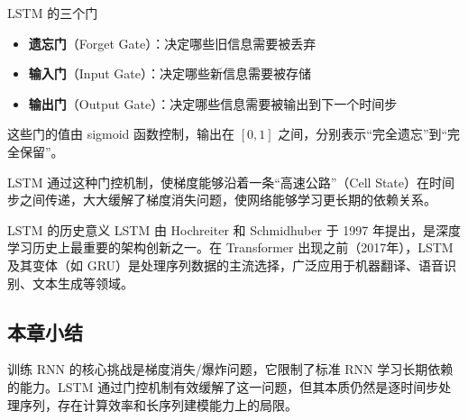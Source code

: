 \begin{importantbox}{LSTM 的三个门}
\begin{itemize}
    \item \textbf{遗忘门}（Forget Gate）：决定哪些旧信息需要被丢弃
    \item \textbf{输入门}（Input Gate）：决定哪些新信息需要被存储
    \item \textbf{输出门}（Output Gate）：决定哪些信息需要被输出到下一个时间步
\end{itemize}
这些门的值由 sigmoid 函数控制，输出在 $[0, 1]$ 之间，分别表示``完全遗忘''到``完全保留''。
\end{importantbox}

LSTM 通过这种门控机制，使梯度能够沿着一条``高速公路''（Cell State）在时间步之间传递，大大缓解了梯度消失问题，使网络能够学习更长期的依赖关系。

\begin{knowledgebox}{LSTM 的历史意义}
LSTM 由 Hochreiter 和 Schmidhuber 于 1997 年提出，是深度学习历史上最重要的架构创新之一。在 Transformer 出现之前（2017年），LSTM 及其变体（如 GRU）是处理序列数据的主流选择，广泛应用于机器翻译、语音识别、文本生成等领域。
\end{knowledgebox}

\subsection{本章小结}

训练 RNN 的核心挑战是梯度消失/爆炸问题，它限制了标准 RNN 学习长期依赖的能力。LSTM 通过门控机制有效缓解了这一问题，但其本质仍然是逐时间步处理序列，存在计算效率和长序列建模能力上的局限。

\newpage
